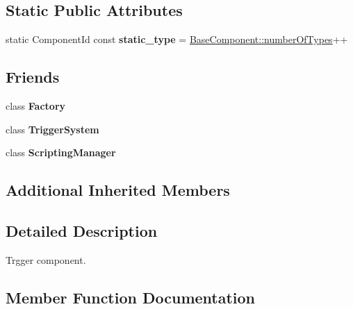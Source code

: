 \subsection*{Static Public Attributes}
\begin{DoxyCompactItemize}
\item 
\mbox{\label{classTriggerComponent_aabee18d0032cffdfc5145517db4eb2ac}} 
static Component\+Id const {\bfseries static\+\_\+type} = \hyperlink{classBaseComponent_a084ade347bc71a7f0d3b17ecdc2225a4}{Base\+Component\+::number\+Of\+Types}++
\end{DoxyCompactItemize}
\subsection*{Friends}
\begin{DoxyCompactItemize}
\item 
\mbox{\label{classTriggerComponent_a328c093d609680cca505905c6d49901a}} 
class {\bfseries Factory}
\item 
\mbox{\label{classTriggerComponent_a77e645014b1348deb41028fe9a3bf122}} 
class {\bfseries Trigger\+System}
\item 
\mbox{\label{classTriggerComponent_ab3d6fafb2064bace492fd6b503d044f4}} 
class {\bfseries Scripting\+Manager}
\end{DoxyCompactItemize}
\subsection*{Additional Inherited Members}


\subsection{Detailed Description}
Trgger component. 

\subsection{Member Function Documentation}
\mbox{\label{classTriggerComponent_a095e19d7f322e6e117bdbd5001015b8b}} 
